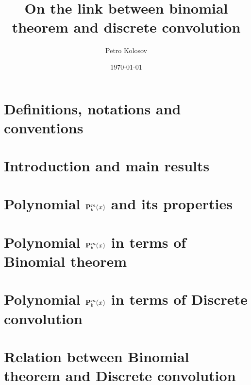 \documentclass[12pt,letterpaper,oneside,reqno]{amsart}
\title[On the link between binomial theorem and discrete convolution]
{On the link between binomial theorem and discrete convolution}
\author[Petro Kolosov]{Petro Kolosov}
\date{\today}
\newcommand \polynomialP [4][P]{{\mathbf{#1}}\sp{#2} \sb{#3}(#4)}
\numberwithin{equation}{section}
\begin{document}
    \begin{abstract}
        
    \end{abstract}
    \maketitle
    \tableofcontents


    \section{Definitions, notations and conventions} \label{sec:definitions-notations-and-conventions}
    


    \section{Introduction and main results} \label{sec:introduction}
    


    \section{Polynomial \texorpdfstring{$\polynomialP{m}{b}{x}$}{P[m,b,x]} and its properties}
    \label{sec:polynomial-p-and-its-properties}
    


    \section{Polynomial \texorpdfstring{$\polynomialP{m}{b}{x}$}{P[m,b,x]} in terms of Binomial theorem}
    \label{sec:odd-binomial-expansion-as-partial-case-of-polynomial-p}
    


    \section{Polynomial \texorpdfstring{$\polynomialP{m}{b}{x}$}{P[m,b,x]} in terms of Discrete convolution}
    \label{sec:relation-between-p-and-convolution-of-polynomials}
    


    \section{Relation between Binomial theorem and Discrete convolution}
    \label{sec:relation-between-binomial-theorem-and-discrete-convolution}
    
\end{document}
